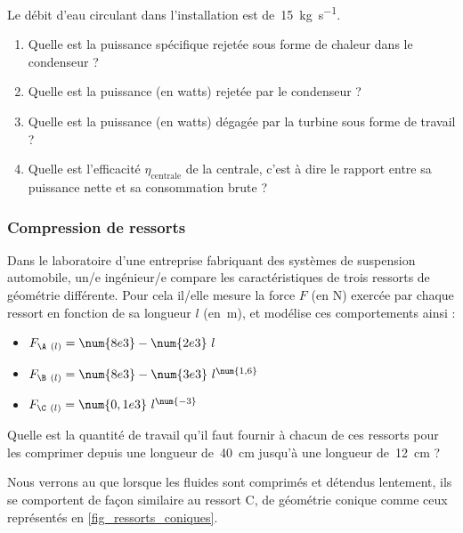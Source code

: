 	Le débit d’eau circulant dans l’installation est de~\SI{15}{\kilogram\per\second}.

	\begin{enumerate}
		\item Quelle est la puissance spécifique rejetée sous forme de chaleur dans le condenseur ?
		\item Quelle est la puissance (en \si{watts}) rejetée par le condenseur ?
		\item Quelle est la puissance (en \si{watts}) dégagée par la turbine sous forme de travail ?
		\item Quelle est l’efficacité $\eta_{\text{centrale}}$ de la centrale, c’est à dire le rapport entre sa puissance nette et sa consommation brute ?
	\end{enumerate}	

\subsubsection{Compression de ressorts}
\label{exo_compression_ressorts}
	
	Dans le laboratoire d’une entreprise fabriquant des systèmes de suspension automobile, un/e ingénieur/e compare les caractéristiques de trois ressorts de géométrie différente. Pour cela il/elle mesure la force $F$ (en \si{\newton}) exercée par chaque ressort en fonction de sa longueur $l$ (en~\si{\metre}), et modélise ces comportements ainsi :
	
		\begin{itemize}
			\item \onlyframabook{~~}$F_{\A\ (l)} = \num{8e3} - \num{2e3} \ l$ %
			\item \onlyframabook{~~}$F_{\B\ (l)} = \num{8e3} - \num{3e3} \ l^{\num{1,6}}$
			\item \onlyframabook{~~}$F_{\C\ (l)} = \num{0,1e3} \ l^{\num{-3}}$
		\end{itemize}
		
	Quelle est la quantité de travail qu’il faut fournir à chacun de ces ressorts pour les comprimer depuis une longueur de~\SI{40}{\centi\metre} jusqu’à une longueur de~\SI{12}{\centi\metre} ?
	
	Nous verrons au \coursdeux que lorsque les fluides sont comprimés et détendus lentement, ils se comportent de façon similaire au ressort C, de géométrie conique comme ceux représentés en \cref{fig_ressorts_coniques}.
	

